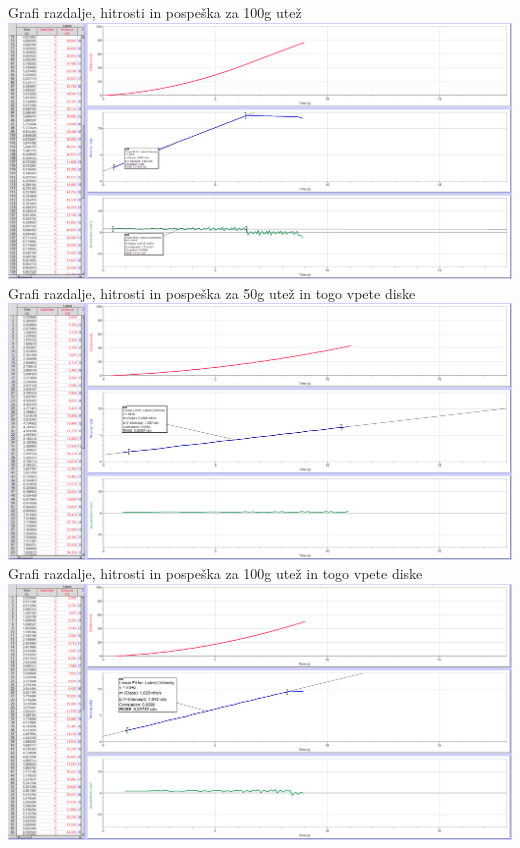 \documentclass[a4paper]{report}
\begin{document}
\pagebreak
\noindent Grafi razdalje, hitrosti in pospeška za 100g utež\\
\includegraphics[width = \textwidth]{100g}\\

\noindent Grafi razdalje, hitrosti in pospeška za 50g utež in togo vpete diske\\
\includegraphics[width = \textwidth]{Togo 50g}\\

\noindent Grafi razdalje, hitrosti in pospeška za 100g utež in togo vpete diske\\
\includegraphics[width = \textwidth]{Togo 100g}\\
\end{document}
